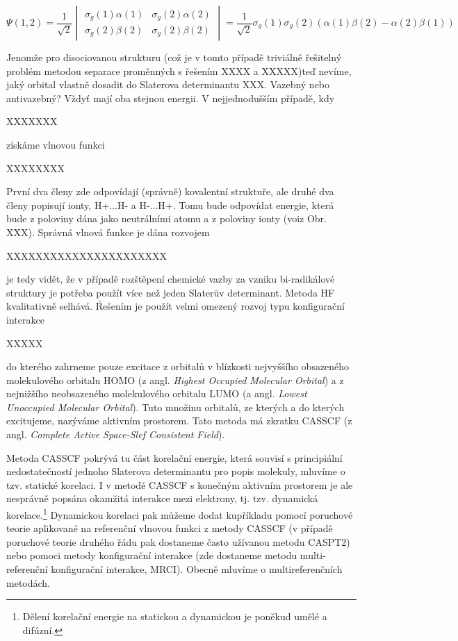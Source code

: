\begin{equation}
\Psi (1,2)=\frac{1}{\sqrt{2}}
\begin{vmatrix}
\sigma_g(1)\alpha (1) & \sigma_g(2)\alpha (2) \\
\sigma_g(2)\beta (2) & \sigma_g(2)\beta (2)
\end{vmatrix}
=\frac{1}{\sqrt{2}}\sigma_g(1)\sigma_g(2)(\alpha (1)\beta (2)-\alpha (2)\beta (1))
\end{equation}

Jenomže pro disociovanou strukturu (což je v tomto  případě triviálně řešitelný problém metodou separace proměnných s řešením XXXX a XXXXX)teď nevíme, jaký orbital vlastně dosadit do Slaterova determinantu XXX. Vazebný nebo antivazebný? Vždyť mají oba stejnou energii. V nejjednodušším případě, kdy 

XXXXXXX

\noindent získáme vlnovou funkci


XXXXXXXX


\noindent První dva členy zde odpovídají (správně) kovalentní struktuře, ale druhé dva členy popisují ionty, H+...H- a H-...H+. Tomu bude odpovídat energie, která bude z poloviny dána jako neutrálními atomu a z poloviny ionty (voiz Obr. XXX). Správná vlnová funkce je dána rozvojem


XXXXXXXXXXXXXXXXXXXXXX



\noindent je tedy vidět, že v případě rozštěpení chemické vazby za vzniku bi-radikálové struktury je potřeba použít více než jeden Slaterův determinant. Metoda HF kvalitativně selhává. Ŕešením je použít velmi omezený rozvoj typu konfigurační interakce

XXXXX

\noindent do kterého zahrneme pouze excitace z orbitalů v blízkosti nejvyššího obsazeného molekulového orbitalu HOMO (z angl. \textit{Highest Occupied Molecular Orbital}) a z nejnižšího neobsazeného molekulového orbitalu LUMO (a angl. \textit{Lowest Unoccupied Molecular Orbital}). Tuto množinu orbitalů, ze kterých a do kterých excitujeme, nazýváme aktivním prostorem. Tato metoda má zkratku CASSCF (z angl. \textit{Complete Active Space-Slef Consistent Field}). 


Metoda CASSCF pokrývá tu část korelační energie, která souvisí s principiální nedostatečností jednoho Slaterova determinantu pro popis molekuly, mluvíme o tzv. statické korelaci. I v metodě CASSCF s konečným aktivním prostorem je ale nesprávně popsána okamžitá interakce mezi elektrony, tj. tzv. dynamická korelace.\footnote{Dělení korelační energie na statickou a dynamickou je poněkud umělé a difúzní.} Dynamickou korelaci pak můžeme dodat kupříkladu pomocí poruchové teorie aplikované na referenční vlnovou funkci z metody CASSCF (v případě poruchové teorie druhého řádu pak dostaneme často užívanou metodu CASPT2) nebo pomoci metody konfigurační interakce (zde dostaneme metodu multi-referenční konfigurační interakce, MRCI). Obecně mluvíme o multireferenčních metodách.

